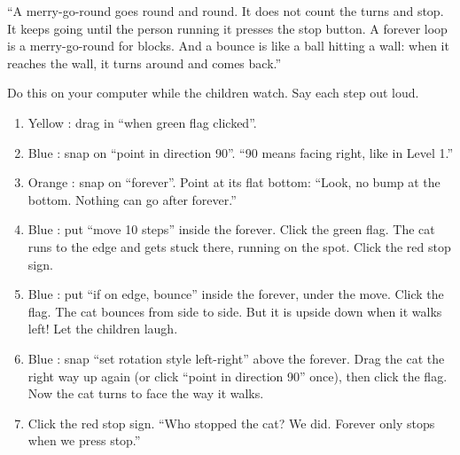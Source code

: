 \begin{analogy}
\enquote{A merry-go-round goes round and round. It does not count the turns and stop. It keeps going until the person running it presses the stop button. A forever loop is a merry-go-round for blocks. And a bounce is like a ball hitting a wall: when it reaches the wall, it turns around and comes back.}
\end{analogy}

\begin{workedexample}
Do this on your computer while the children watch. Say each step out loud.
\begin{enumerate}[leftmargin=1.4em,itemsep=1pt]
  \item Yellow : drag in \enquote{when green flag clicked}.
  \item Blue : snap on \enquote{point in direction 90}. \enquote{90 means facing right, like in Level 1.}
  \item Orange : snap on \enquote{forever}. Point at its flat bottom: \enquote{Look, no bump at the bottom. Nothing can go after forever.}
  \item Blue : put \enquote{move 10 steps} inside the forever. Click the green flag. The cat runs to the edge and gets stuck there, running on the spot. Click the red stop sign.
  \item Blue : put \enquote{if on edge, bounce} inside the forever, under the move. Click the flag. The cat bounces from side to side. But it is upside down when it walks left! Let the children laugh.
  \item Blue : snap \enquote{set rotation style left-right} above the forever. Drag the cat the right way up again (or click \enquote{point in direction 90} once), then click the flag. Now the cat turns to face the way it walks.
  \item Click the red stop sign. \enquote{Who stopped the cat? We did. Forever only stops when we press stop.}
\end{enumerate}
\begin{center}
\begin{scratch}[scale=0.85]
\end{scratch}
\end{center}
\end{workedexample}

